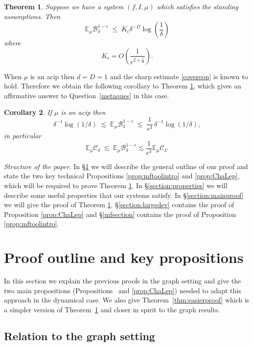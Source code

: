 \documentclass[11pt, reqno]{amsart}
\numberwithin{equation}{section}
\theoremstyle{plain}%
\newtheorem{thm}{Theorem}[section]
\newtheorem{cor}[thm]{Corollary}
\theoremstyle{definition}
\def\B{\ensuremath{\mathcal B}}
\def\C{\ensuremath{\mathcal C}}
\renewcommand{\C}{\mathcal{C}}
\theoremstyle{nonumberplain}
\begin{document}
\begin{thm} Suppose we have a system $(f,I,\mu)$ which satisfies the standing assumptions. Then
\[
\mathbb{E}_\mu \B_\delta^{1-\epsilon}
  \;\leq\; K_\epsilon\delta^{-D}\log \left(\frac1\delta\right)
\]
where $$K_\epsilon=O\left(\frac{1}{\epsilon^{2+\frac{1}{d}}}\right).$$
\label{thm:main}
\end{thm}

When $\mu$ is an acip then $d=D=1$ and the sharp estimate \eqref{covereqn} is known to hold. Therefore we obtain the following corollary to Theorem \ref{thm:main}, which gives an affirmative answer to Question~\ref{metaques} in this case.
\begin{cor} If $\mu$ is an acip then
\[
 \delta^{-1}\log(1/\delta)
  \;\lesssim\; \mathbb{E}_\mu \B_\delta^{1-\epsilon}
  \;\lesssim\; \frac{1}{\epsilon^3}\,\delta^{-1}\log(1/\delta) ,
\]
in particular
$$ \mathbb{E}_\mu \C_\delta\;\lesssim\; \mathbb{E}_\mu \B_\delta^{1-\epsilon}\lesssim \frac{1}{\epsilon^3} \mathbb{E}_\mu \C_\delta .$$
\end{cor}

\textit{Structure of the paper.} In \S \ref{outline} we will describe the general outline of our proof and state the two key technical Propositions \ref{prop:mftoolintro} and \ref{prop:ChaLep}, which will be required to prove Theorem \ref{thm:main}. In \S \ref{section:properties} we will describe some useful properties that our systems satisfy. In \S \ref{section:mainproof} we will give the proof of Theorem \ref{thm:main}. \S \ref{section:largedev} contains the proof of Proposition \ref{prop:ChaLep} and \S \ref{mfsection} contains the proof of Proposition \ref{prop:mftoolintro}.

\section{Proof outline and key propositions}\label{outline}

In this section we explain the previous proofs in the graph setting and give the two main propositions (Propositions~ and \ref{prop:ChaLep}) needed to adapt this approach in the dynamical case.  We also give Theorem~\ref{thm:easierproof} which is a simpler version of Theorem~\ref{thm:main} and closer in spirit to the graph results.

\subsection{Relation to the graph setting} \label{heuristics}
\end{document}

